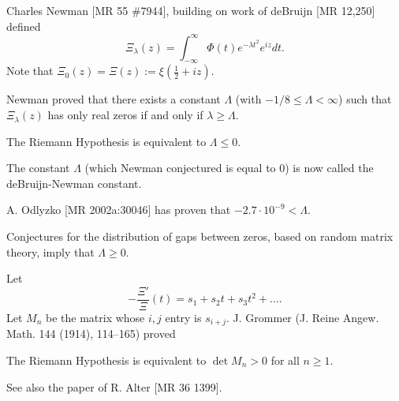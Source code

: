 \documentclass[12pt,letterpaper, reqno]{amsart}
\begin{document}
\begin{problemblock}
Charles Newman [MR 55 \#7944],
building on work of deBruijn [MR 12,250]
defined
$$
\Xi_\lambda(z)=\int_{-\infty}^\infty \Phi(t)e^{-\lambda t^2}e^{iz}  dt.
$$
Note that $\Xi_0(z)=\Xi(z):=\xi(\frac12 + i z)$.

Newman proved that there exists a constant $\Lambda$ (with $-1/8 \le
\Lambda < \infty$) such that $\Xi_\lambda(z)$ has only real zeros if
and only if $\lambda\ge \Lambda$.

\begin{rhequivalence}[9.2] 
The Riemann Hypothesis is equivalent to
$\Lambda\le 0$.
\end{rhequivalence}

\begin{distinguishedremark}
The constant $\Lambda$ (which Newman conjectured is equal to 0) is now called the deBruijn-Newman constant.
\end{distinguishedremark}

\begin{remark}
A. Odlyzko [MR 2002a:30046] has proven that
$-2.7·10^{-9}<\Lambda$.
\end{remark}

\begin{remark}
Conjectures for the distribution of gaps between zeros,
based on random matrix theory, imply that $\Lambda \ge 0$.
\end{remark}

\end{problemblock}

\begin{problemblock}
Let
$$-\frac{\Xi'}{\Xi}(t)=s_1+s_2t+s_3t^2+\dots.$$
Let $M_n$ be the matrix whose $i,j$ entry is $s_{i+j}$.
J. Grommer (J. Reine Angew. Math.  144 (1914), 114--165) proved


\begin{rhequivalence}[9.3] 
The Riemann Hypothesis is equivalent to
$\det M_n>0 $ for all $n\ge 1$.
\end{rhequivalence}


\begin{remark}
See also the paper of R. Alter [MR 36 1399].
\end{remark}
\end{problemblock}
\end{document}
